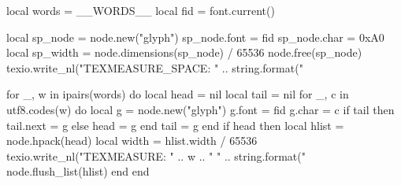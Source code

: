\documentclass{article}
\begin{document}
\fontsize{__FONT_SIZE__pt}{__LEADING__pt}\selectfont

\begin{luacode}
local words = {__WORDS__}
local fid = font.current()

local sp_node = node.new("glyph")
sp_node.font = fid
sp_node.char = 0xA0
local sp_width = node.dimensions(sp_node) / 65536
node.free(sp_node)
texio.write_nl("TEXMEASURE_SPACE: " .. string.format("%

for _, w in ipairs(words) do
  local head = nil
  local tail = nil
  for _, c in utf8.codes(w) do
    local g = node.new("glyph")
    g.font = fid
    g.char = c
    if tail then
      tail.next = g
    else
      head = g
    end
    tail = g
  end
  if head then
    local hlist = node.hpack(head)
    local width = hlist.width / 65536
    texio.write_nl("TEXMEASURE: " .. w .. " " .. string.format("%
    node.flush_list(hlist)
  end
end
\end{luacode}
\end{document}
